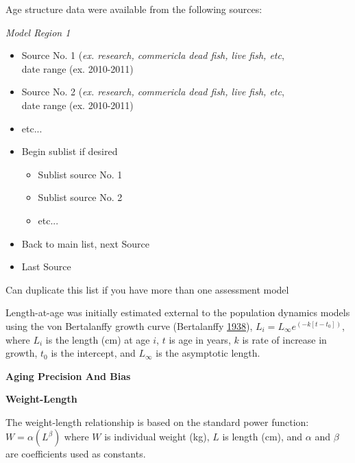 \documentclass[12pt,]{article}
\begin{document}
Age structure data were available from the following sources:

\emph{Model Region 1}

\begin{itemize}[noitemsep,nolistsep,topsep=0pt]
  \item Source No. 1 (\emph{ex. research, commericla dead fish, live fish, etc},\\ 
        date range (ex. 2010-2011)
  \item Source No. 2 (\emph{ex. research, commericla dead fish, live fish, etc},\\
        date range (ex. 2010-2011) 
  \item etc...      
  \item Begin sublist if desired 
    \begin{itemize}[noitemsep,nolistsep]
      \item Sublist source No. 1     
      \item Sublist source No. 2        
      \item etc...     
    \end{itemize}
  \item Back to main list, next Source     
  \item Last Source     
\end{itemize}

Can duplicate this list if you have more than one assessment model

Length-at-age was initially estimated external to the population
dynamics models using the von Bertalanffy growth curve (Bertalanffy
\protect\hyperlink{ref-vonB1938}{1938}),
\(L_i = L_{\infty}e^{(-k[t-t_0])}\), where \(L_i\) is the length (cm) at
age \(i\), \(t\) is age in years, \(k\) is rate of increase in growth,
\(t_0\) is the intercept, and \(L_{\infty}\) is the asymptotic length.

\vspace{.5cm}

\textbf{Aging Precision And Bias}

\vspace{.5cm}

\textbf{Weight-Length}

The weight-length relationship is based on the standard power function:
\(W = \alpha(L^\beta)\) where \(W\) is individual weight (kg), \(L\) is
length (cm), and \(\alpha\) and \(\beta\) are coefficients used as
constants.
\end{document}
